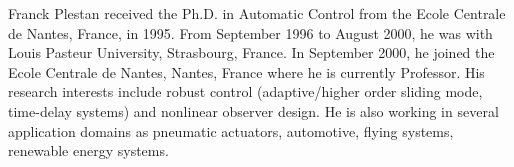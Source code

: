 \documentclass[journal,twoside,web]{ieeecolor}
\begin{document}
\begin{IEEEbiography}{Franck Plestan} received the Ph.D. in Automatic Control from the Ecole Centrale de Nantes, France, in 1995. From September 1996 to August 2000, he was with Louis Pasteur University, Strasbourg, France. In September 2000, he joined the Ecole Centrale de Nantes, Nantes, France where he is currently Professor. His research interests include robust control (adaptive/higher order sliding mode, time-delay systems) and nonlinear observer design. He is also working in several application domains as pneumatic actuators,  automotive, flying systems, renewable energy systems. 
\end{IEEEbiography}
\end{document}
